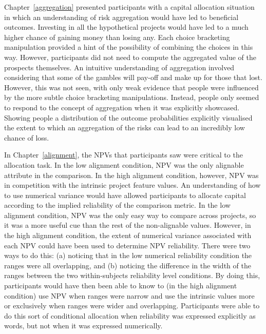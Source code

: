 \documentclass[a4paper, nobind]{templates/ociamthesis}
\theoremstyle{definition}
\theoremstyle{definition}
\theoremstyle{definition}
\theoremstyle{definition}
\theoremstyle{remark}
\begin{document}
Chapter~\ref{aggregation} presented participants with a capital allocation
situation in which an understanding of risk aggregation would have led to
beneficial outcomes. Investing in all the hypothetical projects would have led
to a much higher chance of gaining money than losing any. Each choice bracketing
manipulation provided a hint of the possibility of combining the choices in this
way. However, participants did not need to compute the aggregated value of the
prospects themselves. An intuitive understanding of aggregation involved
considering that some of the gambles will pay-off and make up for those that
lost. However, this was not seen, with only weak evidence that people were
influenced by the more subtle choice bracketing manipulations. Instead, people
only seemed to respond to the concept of aggregation when it was explicitly
showcased. Showing people a distribution of the outcome probabilities explicitly
visualised the extent to which an aggregation of the risks can lead to an
incredibly low chance of loss.

In Chapter~\ref{alignment}, the NPVs that participants saw were critical to the
allocation task. In the low alignment condition, NPV was the only alignable
attribute in the comparison. In the high alignment condition, however, NPV was
in competition with the intrinsic project feature values. An understanding of
how to use numerical variance would have allowed participants to allocate
capital according to the implied reliability of the comparison metric. In the
low alignment condition, NPV was the only easy way to compare across projects,
so it was a more useful cue than the rest of the non-alignable values. However,
in the high alignment condition, the extent of numerical variance associated
with each NPV could have been used to determine NPV reliability. There were two
ways to do this: (a) noticing that in the low numerical reliability condition
the ranges were all overlapping, and (b) noticing the difference in the width of
the ranges between the two within-subjects reliability level conditions. By
doing this, participants would have then been able to know to (in the high
alignment condition) use NPV when ranges were narrow and use the intrinsic
values more or exclusively when ranges were wider and overlapping. Participants
were able to do this sort of conditional allocation when reliability was
expressed explicitly as words, but not when it was expressed numerically.
\end{document}
